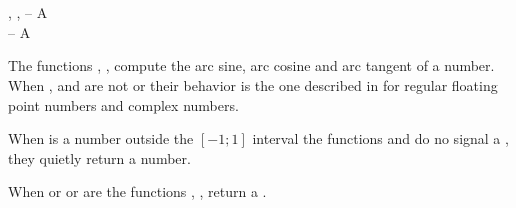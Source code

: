 \documentclass[../Exponentials-Logarithms-Trigonometry.tex]{subfiles}
\begin{document}

\DSyntax{}

  \RArrow {}\\
  \RArrow {}\\
    \RArrow
{}

\DArgsNValues{}

, ,  -- A \\
 -- A 

\DDescription{}

The functions , ,  compute the
arc sine, arc cosine and arc tangent of a number. When ,
 and  are not
 or  their behavior is the
one described in \cite{1996:ANSIHyperSpec} for regular floating
point numbers and complex numbers.

\noindent
When  is a  number outside the $[-1; 1]$
interval the functions  and  do no signal a
, they quietly return a
 number.

\noindent
When  or  or  are
 the functions , ,
 return a .
\end{document}
